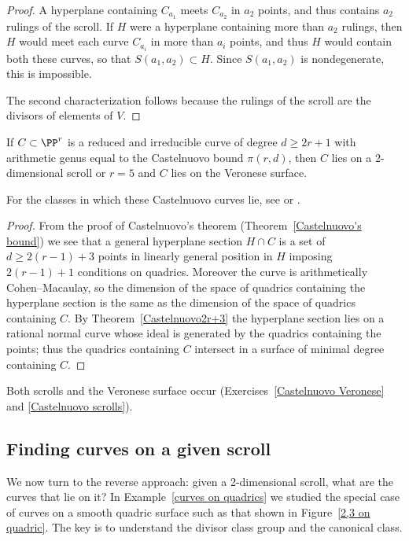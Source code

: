 \begin{proof}
A hyperplane containing $C_{a_1}$ meets $C_{a_2}$ in $a_2$
points, and thus contains $a_2$ rulings of the scroll. If $H$ were a
hyperplane containing more than $a_2$
rulings, then $H$ would meet each curve $C_{a_i}$ in more than $a_i$
points, and thus $H$ would contain
both these curves, so that $S(a_1,a_2)\subset H$. Since $S(a_1,a_2)$
is nondegenerate, this is impossible.

The second characterization follows because the rulings of the scroll
are the divisors of elements of $V$.
\end{proof}

\begin{theorem}\label{Castelnuovo examples}
If $C\subset \PP^r$ is a reduced and irreducible curve of degree $d\geq
2r+1$ with arithmetic genus equal to
the
%
%
Castelnuovo bound $\pi(r,d)$, then $C$ lies on a 2-dimensional scroll
or $r=5$ and $C$ lies on  the 
Veronese surface.
%
\unif
\end{theorem}

For the classes in which these Castelnuovo curves lie, see \cite[Theorem
3.11]{Montreal} or \cite[p.~533]{Griffiths-Harris1978}.
\unif

\begin{proof}
From the proof of Castelnuovo's theorem (Theorem~\ref{Castelnuovo's
bound}) we see that a general hyperplane
section $H\cap C$ is a set of $d\geq 2(r-1)+3$ points in linearly general
position in $H$ imposing $2(r-1)+1$ conditions on quadrics. Moreover
the curve
is arithmetically Cohen--Macaulay, so the dimension of the space of
quadrics containing the hyperplane section
is the same as the dimension of the space of quadrics containing $C$. By
Theorem~\ref{Castelnuovo2r+3} the hyperplane
section lies on a rational normal curve whose ideal is generated by the
quadrics containing the points;
thus the quadrics containing $C$ intersect in a surface of minimal degree
containing $C$.
\unif
\end{proof}

Both scrolls and the Veronese surface occur (Exercises~\ref{Castelnuovo
Veronese} and \ref{Castelnuovo scrolls}).

\subsection*{Finding curves on a given scroll}

We now turn to the reverse approach: given a 2-dimensional scroll,
what are the curves that lie on it?
In Example~\ref{curves on quadrics} we studied the special case of
curves on a smooth quadric surface such as that shown in 
Figure~\ref{2,3 on quadric}.
The key is to understand the divisor class group and the canonical class.

